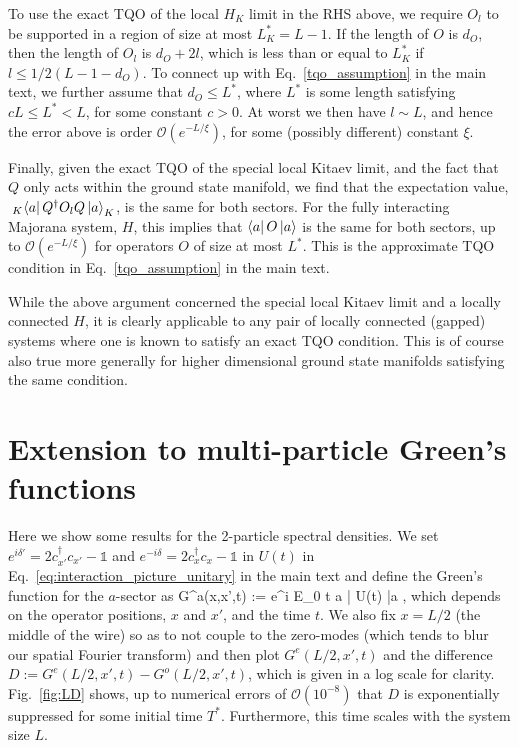 \documentclass[aps,pra,floatfix,footinbib,longbibliography,twocolumn,superscriptaddress, preprintnumbers, nobibnotes]{revtex4-1}
\begin{document}
To use the exact TQO of the local $H_K$ limit in the RHS above, we require $O_l$ to be supported in a region of size at most $L^*_K = L-1$. If the length of $O$ is $d_O$, then the length of $O_l$ is $d_O + 2 l$, which is less than or equal to $L^*_K$ if $l \leq 1/2 ( L- 1 - d_O ) $. To connect up with Eq.~\ref{tqo_assumption} in the main text, we further assume that $d_O \leq L^*$, where $L^*$ is some length satisfying $c L \leq L^* < L$, for some constant $c>0$. At worst we then have $l\sim L$, and hence the error above is order $\mathcal{O} (e^{-L/\xi} )$, for some (possibly different) constant $\xi$.

Finally, given the exact TQO of the special local Kitaev limit, and the fact that $Q$ only acts within the ground state manifold, we find that the expectation value, $\phantom|_K \hspace{-0.5mm} \bra{a} Q^{\dagger} O_l Q \ket{a}_K$, is the same for both sectors. For the fully interacting Majorana system, $H$, this implies that $\left\langle a\right|O\left|a\right\rangle$ is the same for both sectors, up to $\mathcal{O} (e^{-L/\xi} )$ for operators $O$ of size at most $L^*$. This is the approximate TQO condition in Eq.~\ref{tqo_assumption} in the main text. 

While the above argument concerned the special local Kitaev limit and a locally connected $H$, it is clearly applicable to any pair of locally connected (gapped) systems where one is known to satisfy an exact TQO condition. This is of course also true more generally for higher dimensional ground state manifolds satisfying the same condition. 

\section{Extension to multi-particle Green's functions}\label{app:MultPartGF}

Here we show some results for the 2-particle spectral densities. We set $e^{i \delta'}  = 2 c^\dagger_{x'}c_{x'} -\mathds{1}$ and $e^{-i \delta}  =  2 c^\dagger_{x} c_{x}-\mathds{1} $ in $U(t)$ in Eq.~\ref{eq:interaction_picture_unitary} in the main text and define the Green's function for the $a$-sector as
\be
G^{a}(x,x',t) := e^{i E_0 t } \langle a | U(t) |a \rangle \; ,
\ee
which depends on the operator positions, $x$ and $x'$, and the time $t$. We also fix $x=L/2$ (the middle of the wire) so as to not couple to the zero-modes (which tends to blur our spatial Fourier transform) and then plot $G^{e}(L/2,x',t) $ and the difference $D:=G^{e}(L/2,x',t)-G^{o}(L/2,x',t)$, which is given in a log scale for clarity. Fig.~\ref{fig:LD} shows, up to numerical errors of  $\mathcal{O}(10^{-8})$ that $D$ is exponentially suppressed for some initial time $T^*$. Furthermore, this time scales with the system size $L$. 
\end{document}
